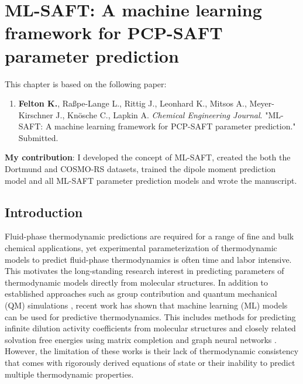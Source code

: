 \chapter{ML-SAFT: A machine learning framework for PCP-SAFT parameter prediction}\label{ch:deep_gamma} 
This chapter is based on the following paper:
\begin{enumerate}
\item \textbf{Felton K.}, Ra{\ss}pe-Lange L., Rittig J., Leonhard K., Mitsos A., Meyer-Kirschner J., Kn\"osche C., Lapkin A. \textit{Chemical Engineering Journal}. "ML-SAFT: A machine learning framework for PCP-SAFT parameter prediction." Submitted.
\end{enumerate}
\textbf{My contribution}: I developed the concept of ML-SAFT, created the both the Dortmund and COSMO-RS datasets, trained the dipole moment prediction model and all ML-SAFT parameter prediction models and wrote the manuscript.

\section{Introduction}
\label{sec:intro}
Fluid-phase thermodynamic predictions are required for a range of fine and bulk chemical applications, yet experimental parameterization of thermodynamic models to predict fluid-phase thermodynamics is often time and labor intensive. This motivates the long-standing research interest in predicting parameters of thermodynamic models directly from molecular structures. In addition to established approaches such as group contribution\cite{Fredenslund1975} and quantum mechanical (QM) simulations \cite{Fingerhut2017,Kaminski2020}, recent work has shown that  machine learning (ML) models can be used for predictive thermodynamics. This includes methods for predicting infinite dilution activity coefficients from molecular structures and closely related  solvation free energies using matrix completion\cite{Jirasek2020} and graph neural networks \cite{Vermeire2021, Felton2022, SanchezMedina2022, Qin2023, Rittig2023}. However, the limitation of these works is their lack of thermodynamic consistency that comes with rigorously derived equations of state or their inability to predict multiple thermodynamic properties. 

